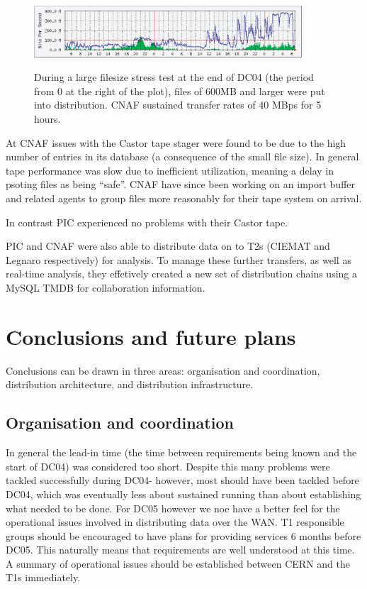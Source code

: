 \documentclass{cmspaper}
\begin{document}
\begin{figure}[tbp]
\centering
\includegraphics[width=10cm]{CNAF-stress.eps}
\label{fig:CNAF-stress}
\caption{During a large filesize stress test at the end of DC04 (the period from 0 at the right of the plot), files of 600MB and larger were put into distribution. CNAF sustained transfer rates of 40 MBps for 5 hours.}
\end{figure} 

At CNAF issues with the Castor tape stager were found to be due to the high number of entries in its database (a consequence of the small file size). In general tape performance was slow due to inefficient utilization, meaning a delay in psoting files as being ``safe''. CNAF have since been working on an import buffer and related agents to group files more reasonably for their tape system on arrival.

In contrast PIC experienced no problems with their Castor tape.

PIC and CNAF were also able to distribute data on to T2s (CIEMAT and Legnaro respectively) for analysis. To manage these further transfers, as well as real-time analysis, they effetively created a new set of distribution chains using a MySQL TMDB for collaboration information.

\section{Conclusions and future plans}
Conclusions can be drawn in three areas: organisation and coordination, distribution 
architecture, and distribution infrastructure.

\subsection{Organisation and coordination}
In general the lead-in time (the time between requirements being known and the start of
DC04) was considered too short. Despite this many problems were tackled successfully 
during DC04- however, most should have been tackled before DC04, which was eventually less
about sustained running than about establishing what needed to be done. For DC05 however
we noe have a better feel for the operational issues involved in distributing data over
the WAN. T1 responsible groups should be encouraged to have plans for providing services 
6 months before DC05. This naturally means that requirements are well understood at this 
time. A summary of operational issues should be established between CERN and the T1s
immediately.
\end{document}
